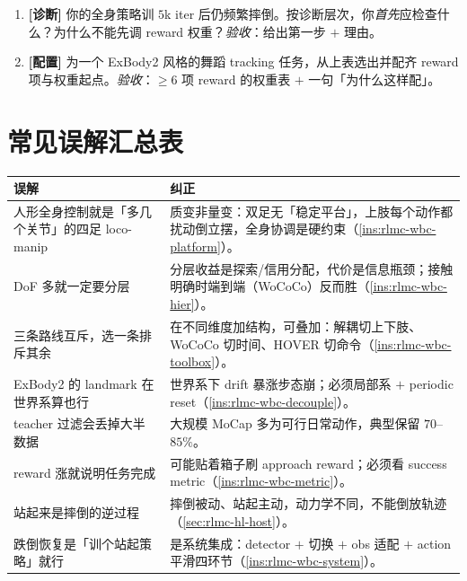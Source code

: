 \begin{practice}[本节动手]
\begin{enumerate}
  \item \textbf{[诊断]} 你的全身策略训 $5$k iter 后仍频繁摔倒。按诊断层次，你\emph{首先}应检查什么？为什么不能先调 reward 权重？\emph{验收}：给出第一步 $+$ 理由。
  \item \textbf{[配置]} 为一个 ExBody2 风格的舞蹈 tracking 任务，从上表选出并配齐 reward 项与权重起点。\emph{验收}：$\geq 6$ 项 reward 的权重表 $+$ 一句「为什么这样配」。
\end{enumerate}
\end{practice}

\section*{常见误解汇总表}

\begin{center}
\small
\begin{tabular}{p{5.0cm}p{8.0cm}}
\hline
误解 & 纠正 \\
\hline
人形全身控制就是「多几个关节」的四足 loco-manip & 质变非量变：双足无「稳定平台」，上肢每个动作都扰动倒立摆，全身协调是硬约束（\cref{ins:rlmc-wbc-platform}）。 \\
DoF 多就一定要分层 & 分层收益是探索/信用分配，代价是信息瓶颈；接触明确时端到端（WoCoCo）反而胜（\cref{ins:rlmc-wbc-hier}）。 \\
三条路线互斥，选一条排斥其余 & 在不同维度加结构，可叠加：解耦切上下肢、WoCoCo 切时间、HOVER 切命令（\cref{ins:rlmc-wbc-toolbox}）。 \\
ExBody2 的 landmark 在世界系算也行 & 世界系下 drift 暴涨步态崩；必须局部系 $+$ periodic reset（\cref{ins:rlmc-wbc-decouple}）。 \\
teacher 过滤会丢掉大半数据 & 大规模 MoCap 多为可行日常动作，典型保留 $70$--$85\%$。 \\
reward 涨就说明任务完成 & 可能贴着箱子刷 approach reward；必须看 success metric（\cref{ins:rlmc-wbc-metric}）。 \\
站起来是摔倒的逆过程 & 摔倒被动、站起主动，动力学不同，不能倒放轨迹（\cref{sec:rlmc-hl-host}）。 \\
跌倒恢复是「训个站起策略」就行 & 是系统集成：detector $+$ 切换 $+$ obs 适配 $+$ action 平滑四环节（\cref{ins:rlmc-wbc-system}）。 \\
\hline
\end{tabular}
\end{center}

